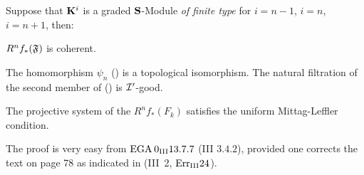 \begin{theorem} \label{IX.2.1}
Suppose that $\KK^i$ is a graded $\bS$-Module \emph{of finite type} for $i=n-1$, $i=n$, $i=n+1$, then:
\begin{enumeratei}
\item
$R^nf_*(\formelF)$ is coherent.
\item
The homomorphism $\psi_n$ () is a topological isomorphism. The natural filtration of the second member of () is ${\Ib}$-good.
\item
The projective system of the $R^nf_*(F_k)$ satisfies the uniform Mittag-Leffler condition.
\end{enumeratei}
\end{theorem}

The proof is very easy from $\EGA 0_{\textup{III}} 13.7.7$ (\cf \EGA III $3.4.2$), provided one corrects the text on page 78 as indicated\label{pagerectif} in (\EGA III~2, $\rm{Err}_{\rm{III}}24$).

